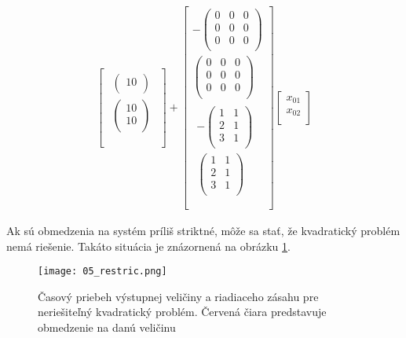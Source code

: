 \begin{equation}
\begin{split}
\begin{bmatrix}
\begin{matrix}
\begin{pmatrix}
10 \\
\end{pmatrix} \\
\begin{pmatrix}
10 \\
10 \\
\end{pmatrix} \\
\end{matrix} \\
\end{bmatrix} + \begin{bmatrix}
 - \begin{pmatrix}
0 & 0 & 0 \\
0 & 0 & 0 \\
0 & 0 & 0 \\
\end{pmatrix} \\
\begin{pmatrix}
0 & 0 & 0 \\
0 & 0 & 0 \\
0 & 0 & 0 \\
\end{pmatrix} \\
\begin{matrix}
 - \begin{pmatrix}
1 & 1 \\
2 & 1 \\
3 & 1 \\
\end{pmatrix} \\
\begin{pmatrix}
1 & 1 \\
2 & 1 \\
3 & 1 \\
\end{pmatrix} \\
\end{matrix} \\
\end{bmatrix}\begin{bmatrix}
x_{01} \\
x_{02} \\
\end{bmatrix}
\end{split}
\end{equation}

Ak sú obmedzenia na systém príliš striktné, môže sa stať, že kvadratický
problém nemá riešenie. Takáto situácia je znázornená na obrázku \ref{05_restric}.

\begin{figure}[h]
\centering
\texttt{[image: 05\_restric.png]}
\caption{Časový priebeh výstupnej veličiny a riadiaceho zásahu pre neriešiteľný kvadratický problém. Červená čiara predstavuje obmedzenie na danú veličinu}
\label{05_restric}
\end{figure}

